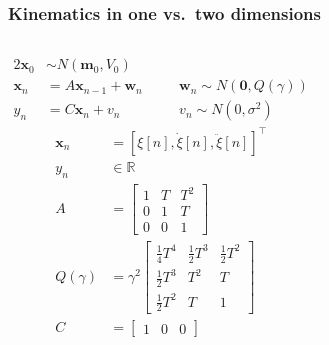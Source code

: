 \begin{frame}
    \frametitle{Kinematics in one vs.\ two dimensions}

  \begin{columns}[T] %
   
      \scriptsize
      \vspace{-1em} %
      \begin{alignat*}{2}
		\mathbf{x}_0 & \sim N(\mathbf{m}_0, V_0) &&\\
        \mathbf{x}_n &= A\mathbf{x}_{n-1} + \mathbf{w}_n && \quad \mathbf{w}_n\sim N(\mathbf{0}, Q(\gamma)) \\
        y_n &= C\mathbf{x}_{n} + v_n && \quad v_n\sim N(0, \sigma^2)
      \end{alignat*}
      \vspace{-0.8em}
      \begin{align*}
        \mathbf{x}_n&=\left[\xi[n],\dot{\xi}[n],\ddot{\xi}[n]\right]^\intercal\\[2pt]
        y_n&\in\mathbb{R}\\[2pt]
        A&=\begin{bmatrix}
            1 & T & T^2\\
            0 & 1 & T\\
            0 & 0 & 1 
          \end{bmatrix}\\[2pt]
        Q(\gamma)&=\gamma^2\begin{bmatrix}
            \frac{1}{4}T^4&\frac{1}{2}T^3&\frac{1}{2}T^2\\
            \frac{1}{2}T^3&T^2&T\\
            \frac{1}{2}T^2&T&1 
          \end{bmatrix}\\[2pt]
        C&=\begin{bmatrix}
            1 & 0 & 0
          \end{bmatrix}
      \end{align*}


\end{columns}
\end{frame}
